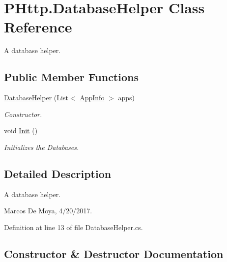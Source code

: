 \hypertarget{class_p_http_1_1_database_helper}{}\section{P\+Http.\+Database\+Helper Class Reference}
\label{class_p_http_1_1_database_helper}


A database helper.  


\subsection*{Public Member Functions}
\begin{DoxyCompactItemize}
\item 
\hyperlink{class_p_http_1_1_database_helper_a3508f142f79494218850e2fb0465abc9}{Database\+Helper} (List$<$ \hyperlink{class_p_http_1_1_app_info}{App\+Info} $>$ apps)
\begin{DoxyCompactList}\small\item\em Constructor. \end{DoxyCompactList}\item 
void \hyperlink{class_p_http_1_1_database_helper_a018277fa7d5e84bd4f1d798ed353fe9d}{Init} ()
\begin{DoxyCompactList}\small\item\em Initializes the Databases. \end{DoxyCompactList}\end{DoxyCompactItemize}


\subsection{Detailed Description}
A database helper. 

Marcos De Moya, 4/20/2017. 

Definition at line 13 of file Database\+Helper.\+cs.



\subsection{Constructor \& Destructor Documentation}
\mbox{\label{class_p_http_1_1_database_helper_a3508f142f79494218850e2fb0465abc9}} 
